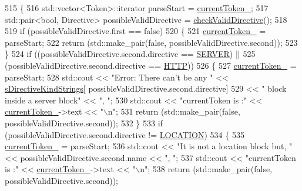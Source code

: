 \begin{DoxyCode}
515     \{
516         std::vector<Token>::iterator parseStart = \hyperlink{classft_1_1_parser_a942c5b794d108f144c5b5028aaa34cb6}{currentToken\_};
517         std::pair<bool, Directive> possibleValidDirective = \hyperlink{classft_1_1_parser_ad48298d21629daf7c9a31e101bf322ba}{checkValidDirective}();
518 
519         \textcolor{keywordflow}{if} (possibleValidDirective.first == \textcolor{keyword}{false}) 
520         \{
521             \hyperlink{classft_1_1_parser_a942c5b794d108f144c5b5028aaa34cb6}{currentToken\_} = parseStart;
522             \textcolor{keywordflow}{return} (std::make\_pair(\textcolor{keyword}{false}, possibleValidDirective.second));
523         \}
524         \textcolor{keywordflow}{if} ((possibleValidDirective.second.directive == \hyperlink{namespaceft_a5a5554dff10f0dc50bae4cc5825ad75da67c96b24b23bcb408bae7626730a04b7}{SERVER}) || 
525             (possibleValidDirective.second.directive == \hyperlink{namespaceft_a5a5554dff10f0dc50bae4cc5825ad75da67e044074f46e6cea22788527da5f02e}{HTTP}))
526         \{
527             \hyperlink{classft_1_1_parser_a942c5b794d108f144c5b5028aaa34cb6}{currentToken\_} = parseStart;
528             std::cout << \textcolor{stringliteral}{"Error: There can't be any "} << \hyperlink{namespaceft_a2896a632198d516af93e4aea2d125f59}{sDirectiveKindStrings}[
      possibleValidDirective.second.directive] 
529                 << \textcolor{stringliteral}{" block inside a server block"} << \textcolor{stringliteral}{", "};
530             std::cout << \textcolor{stringliteral}{"currentToken is :"} << \hyperlink{classft_1_1_parser_a942c5b794d108f144c5b5028aaa34cb6}{currentToken\_}->text << \textcolor{stringliteral}{"\(\backslash\)n"};
531             \textcolor{keywordflow}{return} (std::make\_pair(\textcolor{keyword}{false}, possibleValidDirective.second));
532         \}
533         \textcolor{keywordflow}{if} (possibleValidDirective.second.directive != \hyperlink{namespaceft_a5a5554dff10f0dc50bae4cc5825ad75da1e9e3944b93fde52c7c92e1e15dcaf4a}{LOCATION})
534         \{
535             \hyperlink{classft_1_1_parser_a942c5b794d108f144c5b5028aaa34cb6}{currentToken\_} = parseStart;
536             std::cout << \textcolor{stringliteral}{"It is not a location block but, "} << possibleValidDirective.second.name << \textcolor{stringliteral}{", "};
537             std::cout << \textcolor{stringliteral}{"currentToken is :"} << \hyperlink{classft_1_1_parser_a942c5b794d108f144c5b5028aaa34cb6}{currentToken\_}->text << \textcolor{stringliteral}{"\(\backslash\)n"};
538             \textcolor{keywordflow}{return} (std::make\_pair(\textcolor{keyword}{false}, possibleValidDirective.second));

\end{DoxyCode}
